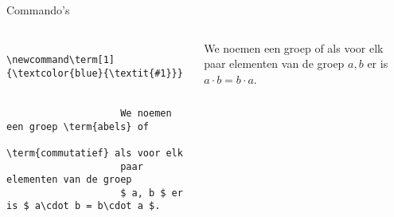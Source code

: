 \begin{frame}[fragile]{Commando's}
    \begin{columns}
        \begin{column}{0.5\textwidth}
            \begin{verbatim}
                \newcommand\term[1]{\textcolor{blue}{\textit{#1}}}
        
                
                    We noemen een groep \term{abels} of
                    \term{commutatief} als voor elk
                    paar elementen van de groep
                    $ a, b $ er is $ a\cdot b = b\cdot a $.
                
            \end{verbatim}
        \end{column}
        \begin{column}{0.5\textwidth}
            \begin{demobox}\small\setlength\parskip{5pt}        
                We noemen een groep  of
                 als
                voor elk paar elementen van de groep $ a, b $
                er is $ a\cdot b = b\cdot a $.
            \end{demobox}
        \end{column}
    \end{columns}    
\end{frame}

\let\diag\somethingundefined
\newcommand\diag[2]{\begin{pmatrix}
    #2 & #1\\
    #1 & #2
\end{pmatrix}}

